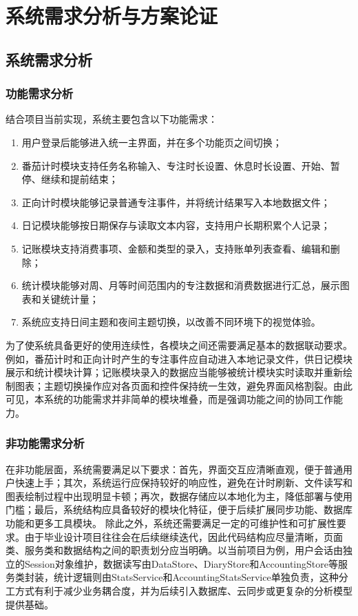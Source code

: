 \chapter{系统需求分析与方案论证}

\section{系统需求分析}

\subsection{功能需求分析}
结合项目当前实现，系统主要包含以下功能需求：
\begin{enumerate}
    \item 用户登录后能够进入统一主界面，并在多个功能页之间切换；
    \item 番茄计时模块支持任务名称输入、专注时长设置、休息时长设置、开始、暂停、继续和提前结束；
    \item 正向计时模块能够记录普通专注事件，并将统计结果写入本地数据文件；
    \item 日记模块能够按日期保存与读取文本内容，支持用户长期积累个人记录；
    \item 记账模块支持消费事项、金额和类型的录入，支持账单列表查看、编辑和删除；
    \item 统计模块能够对周、月等时间范围内的专注数据和消费数据进行汇总，展示图表和关键统计量；
    \item 系统应支持日间主题和夜间主题切换，以改善不同环境下的视觉体验。
\end{enumerate}
为了使系统具备更好的使用连续性，各模块之间还需要满足基本的数据联动要求。例如，番茄计时和正向计时产生的专注事件应自动进入本地记录文件，供日记模块展示和统计模块计算；记账模块录入的数据应当能够被统计模块实时读取并重新绘制图表；主题切换操作应对各页面和控件保持统一生效，避免界面风格割裂。由此可见，本系统的功能需求并非简单的模块堆叠，而是强调功能之间的协同工作能力。

\subsection{非功能需求分析}
在非功能层面，系统需要满足以下要求：首先，界面交互应清晰直观，便于普通用户快速上手；其次，系统运行应保持较好的响应性，避免在计时刷新、文件读写和图表绘制过程中出现明显卡顿；再次，数据存储应以本地化为主，降低部署与使用门槛；最后，系统结构应具备较好的模块化特征，便于后续扩展同步功能、数据库功能和更多工具模块。
除此之外，系统还需要满足一定的可维护性和可扩展性要求。由于毕业设计项目往往会在后续继续迭代，因此代码结构应尽量清晰，页面类、服务类和数据结构之间的职责划分应当明确。以当前项目为例，用户会话由独立的Session对象维护，数据读写由DataStore、DiaryStore和AccountingStore等服务类封装，统计逻辑则由StatsService和AccountingStatsService单独负责，这种分工方式有利于减少业务耦合度，并为后续引入数据库、云同步或更复杂的分析模型提供基础。

